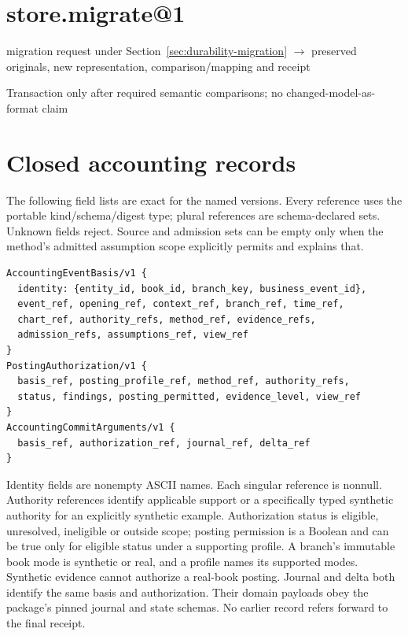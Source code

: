 \hypertarget{store.migrate1}{%
\section{store.migrate@1}\label{store.migrate1}}

migration request under Section~\ref{sec:durability-migration}
\ensuremath{\rightarrow} preserved originals, new representation,
comparison/mapping and receipt

Transaction only after required semantic comparisons; no changed-model-as-format claim

\section{Closed accounting records}

The following field lists are exact for the named versions. Every reference
uses the portable kind/schema/digest type; plural references are schema-declared
sets. Unknown fields reject. Source and admission sets can be empty only when
the method's admitted assumption scope explicitly permits and explains that.

\begin{lstlisting}
AccountingEventBasis/v1 {
  identity: {entity_id, book_id, branch_key, business_event_id},
  event_ref, opening_ref, context_ref, branch_ref, time_ref,
  chart_ref, authority_refs, method_ref, evidence_refs,
  admission_refs, assumptions_ref, view_ref
}
PostingAuthorization/v1 {
  basis_ref, posting_profile_ref, method_ref, authority_refs,
  status, findings, posting_permitted, evidence_level, view_ref
}
AccountingCommitArguments/v1 {
  basis_ref, authorization_ref, journal_ref, delta_ref
}
\end{lstlisting}

Identity fields are nonempty ASCII names. Each singular reference is nonnull.
Authority references identify applicable support or a specifically typed
synthetic authority for an explicitly synthetic example. Authorization status
is eligible, unresolved, ineligible or outside scope; posting permission is a
Boolean and can be true only for eligible status under a supporting profile.
A branch's immutable book mode is synthetic or real, and a profile names its
supported modes. Synthetic evidence cannot authorize a real-book posting.
Journal and delta both identify the same basis and authorization. Their domain
payloads obey the package's pinned journal and state schemas. No earlier record
refers forward to the final receipt.

